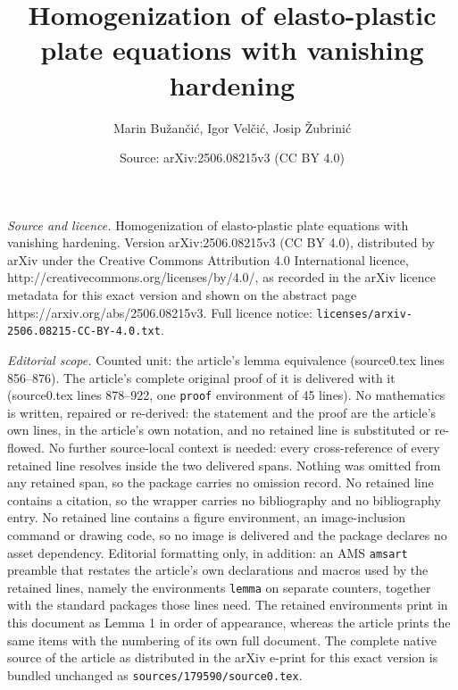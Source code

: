\documentclass[10pt,a4paper]{amsart}
\title{Homogenization of elasto-plastic plate equations with vanishing hardening}
\author{Marin Bu\v{z}an\v{c}i\'c, Igor Vel\v{c}i\'c, Josip \v{Z}ubrini\'c}
\date{Source: arXiv:2506.08215v3 (CC BY 4.0)}
\begin{document}
\maketitle

\noindent\emph{Source and licence.} Homogenization of elasto-plastic plate equations with vanishing hardening. Version arXiv:2506.08215v3 (CC BY 4.0), distributed by arXiv under the Creative Commons Attribution 4.0 International licence, http://creativecommons.org/licenses/by/4.0/, as recorded in the arXiv licence metadata for this exact version and shown on the abstract page https://arxiv.org/abs/2506.08215v3. Full licence notice: \texttt{licenses/arxiv-2506.08215-CC-BY-4.0.txt}.\par\smallskip

\noindent\textit{Editorial scope.} Counted unit: the article's lemma equivalence (source0.tex lines 856--876). The article's complete original proof of it is delivered with it (source0.tex lines 878--922, one \texttt{proof} environment of 45 lines). No mathematics is written, repaired or re-derived: the statement and the proof are the article's own lines, in the article's own notation, and no retained line is substituted or re-flowed.  No further source-local context is needed: every cross-reference of every retained line resolves inside the two delivered spans.  Nothing was omitted from any retained span, so the package carries no omission record.  No retained line contains a citation, so the wrapper carries no bibliography and no bibliography entry.  No retained line contains a figure environment, an image-inclusion command or drawing code, so no image is delivered and the package declares no asset dependency.  Editorial formatting only, in addition: an AMS \texttt{amsart} preamble that restates the article's own declarations and macros used by the retained lines, namely the environments \texttt{lemma} on separate counters, together with the standard packages those lines need.  The retained environments print in this document as Lemma 1 in order of appearance, whereas the article prints the same items with the numbering of its own full document.  The complete native source of the article as distributed in the arXiv e-print for this exact version is bundled unchanged as \texttt{sources/179590/source0.tex}.
\end{document}
